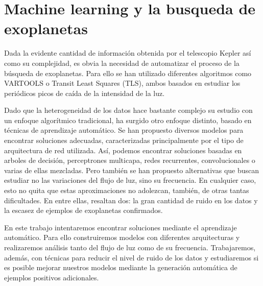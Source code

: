 \section{Machine learning y la busqueda de exoplanetas}

Dada la evidente cantidad de información obtenida por el telescopio Kepler así como su complejidad, es obvia la necesidad de automatizar el proceso de la búsqueda de exoplanetas. Para ello se han utilizado diferentes algoritmos como VARTOOLS\cite{2016A&C....17....1H} o Transit Least Squares (TLS)\cite{2019A&A...623A..39H}, ambos basados en estudiar los periódicos picos de caída de la intensidad de la luz\cite{Minsky-1969}.

Dado que la heterogeneidad de los datos hace bastante complejo su estudio con un enfoque algorítmico tradicional, ha surgido otro enfoque distinto, basado en técnicas de aprendizaje automático. Se han propuesto diversos modelos para encontrar soluciones adecuadas, caracterizadas principalmente por el tipo de arquitectura de red utilizada. Así, podemos encontrar soluciones basadas en arboles de decisión, perceptrones multicapa, redes recurrentes, convolucionales o varias de ellas mezcladas. Pero también se han propuesto alternativas que buscan estudiar no las variaciones del flujo de luz, sino su frecuencia. En cualquier caso, esto no quita que estas aproximaciones no adolezcan, también, de otras tantas dificultades. En entre ellas, resaltan dos: la gran cantidad de ruido en los datos y la escasez de ejemplos de exoplanetas confirmados.

En este trabajo intentaremos encontrar soluciones mediante el aprendizaje automático. Para ello construiremos modelos con diferentes arquitecturas y realizaremos análisis tanto del flujo de luz como de su frecuencia. Trabajaremos, además, con técnicas para reducir el nivel de ruido de los datos y estudiaremos si es posible mejorar nuestros modelos mediante la generación automática de ejemplos positivos adicionales. 